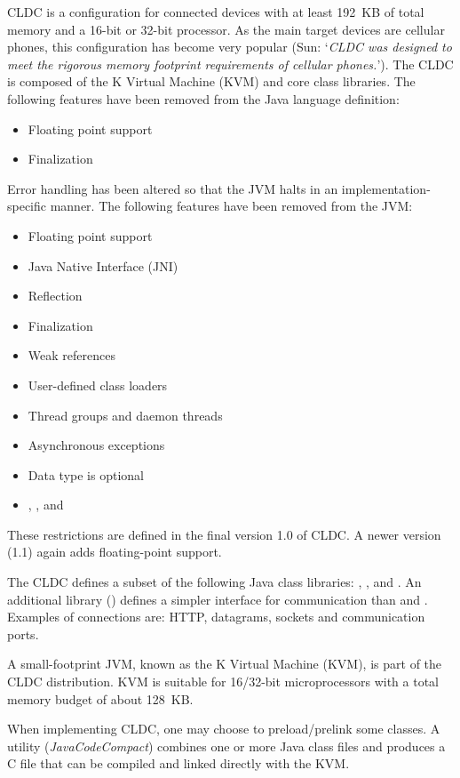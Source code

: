 CLDC is a configuration for connected devices with at least 192~KB
of total memory and a 16-bit or 32-bit processor. As the main target
devices are cellular phones, this configuration has become very
popular (Sun: `\textit{CLDC was designed to meet the rigorous memory
footprint requirements of cellular phones.}'). The CLDC is composed
of the K Virtual Machine (KVM) and core class libraries. The
following features have been removed from the Java language
definition:
%
\begin{itemize}
    \item Floating point support
    \item Finalization
\end{itemize}
%
Error handling has been altered so that the JVM halts in an
implementation-specific manner. The following features have been
removed from the JVM:
%
\begin{itemize}
    \item Floating point support
    \item Java Native Interface (JNI)
    \item Reflection
    \item Finalization
    \item Weak references
    \item User-defined class loaders
    \item Thread groups and daemon threads
    \item Asynchronous exceptions
    \item Data type  is optional
    \item {}, , and 
\end{itemize}
%
These restrictions are defined in the final version 1.0 of CLDC. A
newer version (1.1) again adds floating-point support.

The CLDC defines a subset of the following Java class libraries:
, ,  and
. An additional library
() defines a simpler
interface for communication than  and .
Examples of connections are: HTTP, datagrams, sockets and
communication ports.

A small-footprint JVM, known as the K Virtual Machine (KVM), is part
of the CLDC distribution. KVM is suitable for 16/32-bit
microprocessors with a total memory budget of about 128~KB.

When implementing CLDC, one may choose to preload/prelink some
classes. A utility (\textit{JavaCodeCompact}) combines one or more
Java class files and produces a C file that can be compiled and
linked directly with the KVM.

